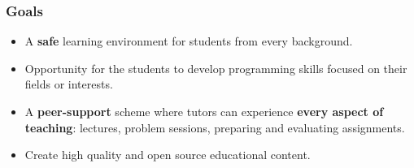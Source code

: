     \begin{frame}
      \frametitle{Goals}
      \Large
      \pause
      \begin{itemize}
        \item A \textbf{safe} learning environment for students from every background.
        \pause
        \item Opportunity for the students to develop programming skills focused on their fields or interests.
        \pause
        \item A \textbf{peer-support} scheme where tutors can experience \textbf{every aspect of teaching}: lectures, problem sessions, preparing and evaluating assignments.
        \pause
        \item Create high quality and open source educational content.
      \end{itemize}      
    \end{frame}

